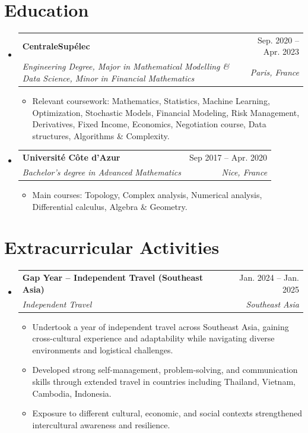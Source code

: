 \documentclass[letterpaper,10.6pt]{article}
\makeatletter
\newcommand{\resumeItem}[1]{
  \item\small{
    {#1 \vspace{-2pt}}
  }
}
\newcommand{\resumeSubheading}[4]{
  \vspace{-2pt}\item
    \begin{tabular*}{0.97\textwidth}[t]{l@{\extracolsep{\fill}}r}
      \textbf{#1} & #2 \\
      \textit{\small#3} & \textit{\small #4} \\
    \end{tabular*}\vspace{-7pt}
}
\newcommand{\resumeSubHeadingListStart}{\begin{itemize}[leftmargin=0.13in, label={}]}
\newcommand{\resumeSubHeadingListEnd}{\end{itemize}}
\newcommand{\resumeItemListStart}{\begin{itemize}}
\newcommand{\resumeItemListEnd}{\end{itemize}\vspace{-5pt}}
\makeatother
\begin{document}
\section{Education}
  \resumeSubHeadingListStart
   \resumeSubheading
  {CentraleSupélec}{Sep. 2020 -- Apr. 2023}
  {Engineering Degree, Major in Mathematical Modelling \& Data Science, Minor in Financial Mathematics}{Paris, France}
  \resumeItemListStart
    \resumeItem{Relevant coursework: Mathematics, Statistics, Machine Learning, Optimization, Stochastic Models, Financial Modeling, Risk Management, Derivatives, Fixed Income, Economics, Negotiation course, Data structures, Algorithms \& Complexity.}
    \resumeItemListEnd
    \resumeSubheading
      {Université Côte d'Azur}{Sep 2017 -- Apr. 2020}
      {Bachelor’s degree in Advanced Mathematics}{Nice, France}
      \resumeItemListStart
        \resumeItem{Main courses: Topology, Complex analysis, Numerical analysis, Differential calculus, Algebra \& Geometry. \newline
       }
    \resumeItemListEnd
  \resumeSubHeadingListEnd

\section{Extracurricular Activities}
    \resumeSubHeadingListStart
      \resumeSubheading
          {Gap Year – Independent Travel (Southeast Asia)
}{Jan. 2024 -- Jan. 2025}
          {Independent Travel }{Southeast Asia}

          \resumeItemListStart
            \resumeItem{Undertook a year of independent travel across Southeast Asia, gaining cross-cultural experience and adaptability while navigating diverse environments and logistical challenges.}
            \resumeItem{Developed strong self-management, problem-solving, and communication skills through extended travel in countries including Thailand, Vietnam, Cambodia, Indonesia.}
            \resumeItem{Exposure to different cultural, economic, and social contexts strengthened intercultural awareness and resilience.}
    
          \resumeItemListEnd
          \resumeSubHeadingListEnd

%
\end{document}

